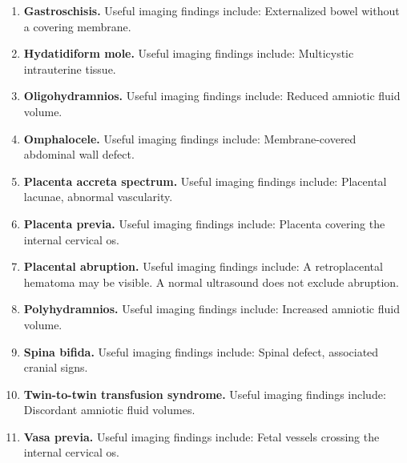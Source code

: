 \begin{enumerate}[leftmargin=*,itemsep=0.45em,topsep=0.4em]
\item \textbf{Gastroschisis.} Useful imaging findings include: Externalized bowel without a covering membrane.
\item \textbf{Hydatidiform mole.} Useful imaging findings include: Multicystic intrauterine tissue.
\item \textbf{Oligohydramnios.} Useful imaging findings include: Reduced amniotic fluid volume.
\item \textbf{Omphalocele.} Useful imaging findings include: Membrane-covered abdominal wall defect.
\item \textbf{Placenta accreta spectrum.} Useful imaging findings include: Placental lacunae, abnormal vascularity.
\item \textbf{Placenta previa.} Useful imaging findings include: Placenta covering the internal cervical os.
\item \textbf{Placental abruption.} Useful imaging findings include: A retroplacental hematoma may be visible. A normal ultrasound does not exclude abruption.
\item \textbf{Polyhydramnios.} Useful imaging findings include: Increased amniotic fluid volume.
\item \textbf{Spina bifida.} Useful imaging findings include: Spinal defect, associated cranial signs.
\item \textbf{Twin-to-twin transfusion syndrome.} Useful imaging findings include: Discordant amniotic fluid volumes.
\item \textbf{Vasa previa.} Useful imaging findings include: Fetal vessels crossing the internal cervical os.
\end{enumerate}

